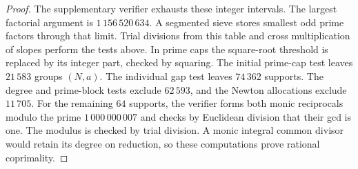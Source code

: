 \begin{proof}
The supplementary verifier exhausts these integer intervals.
The largest factorial argument is \(1\,156\,520\,634\).
A segmented sieve stores smallest odd prime factors through that limit.
Trial divisions from this table and cross multiplication of slopes
perform the tests above. In prime caps the square-root threshold
is replaced by its integer part, checked by squaring. The initial prime-cap test leaves
\(21\,583\) groups \((N,a)\). The individual gap test leaves
\(74\,362\) supports. The degree and prime-block tests exclude
\(62\,593\), and the Newton allocations exclude \(11\,705\).
For the remaining \(64\) supports, the verifier forms both
monic reciprocals modulo the prime \(1\,000\,000\,007\) and
checks by Euclidean division that their gcd is one. The
modulus is checked by trial division. A monic integral common
divisor would retain its degree on reduction, so these
computations prove rational coprimality.
\end{proof}
